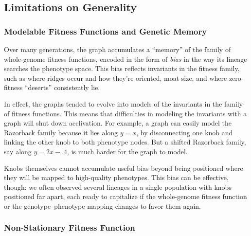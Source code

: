 \documentclass[letterpaper]{article}
\begin{document}

\subsection{Limitations on Generality}

\subsubsection{Modelable Fitness Functions and Genetic Memory}

Over many generations, the graph accumulates a ``memory'' of the family of
whole-genome fitness functions, encoded in the form of \textit{bias} in the way
its lineage searches the phenotype space. This bias reflects invariants in the
fitness family, such as where ridges occur and how they're oriented, moat size,
and where zero-fitness ``deserts'' consistently lie.

In effect, the graphs tended to evolve into models of the invariants in the
family of fitness functions. This means that difficulties in modeling the
invariants with a graph will shut down acclivation. For example, a graph
can easily model the Razorback family because it lies along $y=x$, by
disconnecting one knob and linking the other knob to both phenotype nodes. But
a shifted Razorback family, say along $y=2x-.4$, is much harder for the graph
to model.


Knobs themselves cannot accumulate useful bias beyond being positioned where
they will be mapped to high-quality phenotypes. This bias can be effective,
though: we often observed several lineages in a single population with knobs
positioned far apart, each ready to capitalize if the whole-genome fitness
function or the genotype--phenotype mapping changes to favor them again.

\subsubsection{Non-Stationary Fitness Function}
\end{document}
